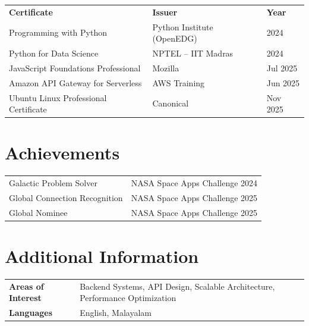 \documentclass[a4paper,10pt]{article}
\begin{document}
\renewcommand{\arraystretch}{1.0}
\begin{tabular}{@{} p{7.8cm} p{6.5cm} p{2.5cm} @{}}
\textbf{Certificate}                  & \textbf{Issuer}              & \textbf{Year} \\[1pt]
Programming with Python               & Python Institute (OpenEDG)   & 2024 \\
Python for Data Science               & NPTEL -- IIT Madras          & 2024 \\
JavaScript Foundations Professional   & Mozilla                      & Jul 2025 \\
Amazon API Gateway for Serverless     & AWS Training                 & Jun 2025 \\
Ubuntu Linux Professional Certificate & Canonical                    & Nov 2025 \\
\end{tabular}

\section*{Achievements}

\begin{tabular}{@{} p{9.5cm} p{8cm} @{}}
Galactic Problem Solver              & NASA Space Apps Challenge 2024 \\
Global Connection Recognition        & NASA Space Apps Challenge 2025 \\
Global Nominee                       & NASA Space Apps Challenge 2025 \\
\end{tabular}

\section*{Additional Information}

\begin{tabular}{@{} >{\bfseries}p{3.8cm} p{13cm} @{}}
Areas of Interest & Backend Systems, API Design, Scalable Architecture, Performance Optimization \\
Languages         & English, Malayalam \\
\end{tabular}

\vspace{3pt}
\end{document}
